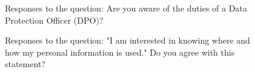 

\begin{figure}
    \centering
    \caption{Responses to the question: Are you aware of the duties of a Data Protection Officer (DPO)?}
    \label{fig:aware_dpo}
\end{figure}

\begin{figure}
    \centering
    \caption{Responses to the question: "I am interested in knowing where and how my personal information is used." Do you agree with this statement?}
    \label{fig:interested_where_how_information_used}
\end{figure}

